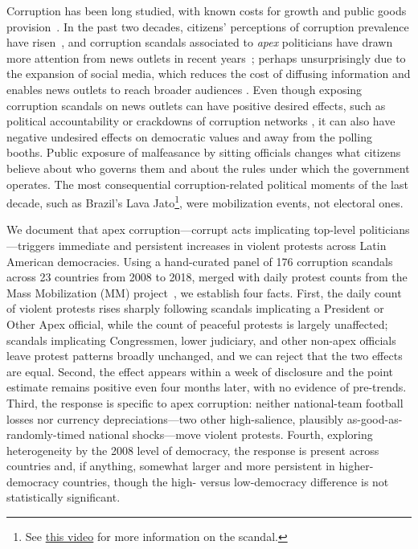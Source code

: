 \documentclass[11pt]{article}
\begin{document}
Corruption has been long studied, with known costs for growth and public goods provision~\citep{mauro1995corruption,treisman2007what,olken2007monitoring,olken2012corruption,glaeser2006corruption}. In the past two decades, citizens' perceptions of corruption prevalence have risen~\citep{cantoni2024protests}, and corruption scandals associated to \textit{apex} politicians have drawn more attention from news outlets in recent years~\citep{ApexCorruption}; perhaps unsurprisingly due to the expansion of social media, which reduces the cost of diffusing information and enables news outlets to reach broader audiences \citep{enikolopov2018SocialMedia, tufekci2024twitter,dellavigna2007fox}. Even though exposing corruption scandals on news outlets can have positive desired effects, such as political accountability or crackdowns of corruption networks \citep{ferraz2011electoral, horacio2019infonetwork, horacio2022metaketa}, it can also have negative undesired effects on democratic values \citep{ajzenman2021powerexample, ApexCorruption} and away from the polling booths. Public exposure of malfeasance by sitting officials changes what citizens believe about who governs them and about the rules under which the government operates. The most consequential corruption-related political moments of the last decade, such as Brazil's Lava Jato\footnote{See \href{https://www.youtube.com/watch?v=boK0Mh2T5nk}{this video} for more information on the scandal.}, were mobilization events, not electoral ones.

We document that apex corruption---corrupt acts implicating top-level politicians---triggers immediate and persistent increases in violent protests across Latin American democracies. Using a hand-curated panel of 176 corruption scandals across 23 countries from 2008 to 2018, merged with daily protest counts from the Mass Mobilization (MM) project~\citep{clark2016mass}, we establish four facts. First, the daily count of violent protests rises sharply following scandals implicating a President or Other Apex official, while the count of peaceful protests is largely unaffected; scandals implicating Congressmen, lower judiciary, and other non-apex officials leave protest patterns broadly unchanged, and we can reject that the two effects are equal. Second, the effect appears within a week of disclosure and the point estimate remains positive even four months later, with no evidence of pre-trends. Third, the response is specific to apex corruption: neither national-team football losses nor currency depreciations---two other high-salience, plausibly as-good-as-randomly-timed national shocks---move violent protests. Fourth, exploring heterogeneity by the 2008 level of democracy, the response is present across countries and, if anything, somewhat larger and more persistent in higher-democracy countries, though the high- versus low-democracy difference is not statistically significant.
\end{document}
